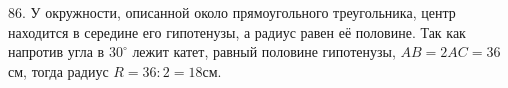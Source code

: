 86. У окружности, описанной около прямоугольного треугольника, центр находится в середине его гипотенузы, а радиус равен её половине. Так как напротив угла в $30^\circ$ лежит катет, равный половине гипотенузы, $AB=2AC=36$см, тогда радиус $R=36:2=18$см.\\
